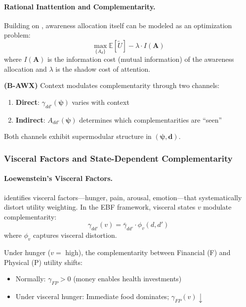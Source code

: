 \paragraph{Rational Inattention and Complementarity.}

Building on \citet{sims2003implications}, awareness allocation itself can be 
modeled as an optimization problem:
\begin{equation}
\max_{\{A_d\}} \mathbb{E}[\tilde{U}] - \lambda \cdot I(\mathbf{A})
\end{equation}
where $I(\mathbf{A})$ is the information cost (mutual information) of the 
awareness allocation and $\lambda$ is the shadow cost of attention.

\begin{axiom}
\label{ax:B-AWX}
\textbf{(B-AWX)} Context modulates complementarity through two channels:
\begin{enumerate}
    \item \textbf{Direct}: $\gamma_{dd'}(\boldsymbol{\psi})$ varies with context
    \item \textbf{Indirect}: $A_{dd'}(\boldsymbol{\psi})$ determines which 
    complementarities are ``seen''
\end{enumerate}
Both channels exhibit supermodular structure in $(\boldsymbol{\psi}, \mathbf{d})$.
\end{axiom}

\subsubsection{Visceral Factors and State-Dependent Complementarity}

\paragraph{Loewenstein's Visceral Factors.}

\citet{PAP-loewenstein1996out} identifies visceral factors---hunger, pain, arousal, 
emotion---that systematically distort utility weighting. In the EBF framework, 
visceral states $v$ modulate complementarity:
\begin{equation}
\gamma_{dd'}(v) = \bar{\gamma}_{dd'} \cdot \phi_v(d, d')
\end{equation}
where $\phi_v$ captures visceral distortion.

\begin{example}
Under hunger ($v = $ high), the complementarity between Financial (F) and Physical (P) 
utility shifts:
\begin{itemize}
    \item Normally: $\gamma_{FP} > 0$ (money enables health investments)
    \item Under visceral hunger: Immediate food dominates; $\gamma_{FP}(v) \downarrow$
\end{itemize}
\end{example}

